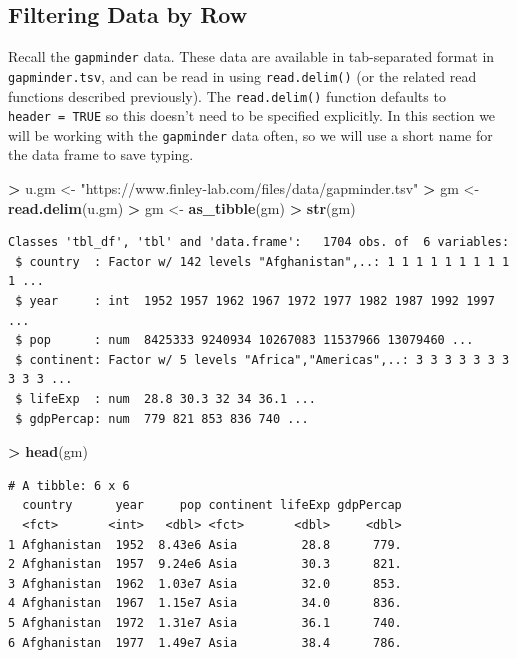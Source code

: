 \documentclass[
]{krantz}
\makeatletter
\newenvironment{Shaded}{\begin{snugshade}}{\end{snugshade}}
\newcommand{\KeywordTok}[1]{\textcolor[rgb]{0.27,0.27,0.27}{\textbf{#1}}}
\newcommand{\NormalTok}[1]{#1}
\newcommand{\OperatorTok}[1]{\textcolor[rgb]{0.43,0.43,0.43}{\textbf{#1}}}
\newcommand{\StringTok}[1]{\textcolor[rgb]{0.5,0.5,0.5}{#1}}
\newenvironment{kframe}{%
\medskip{}
\setlength{\fboxsep}{.8em}
 \def\at@end@of@kframe{}%
 \ifinner\ifhmode%
  \def\at@end@of@kframe{\end{minipage}}%
  \begin{minipage}{\columnwidth}%
 \fi\fi%
 \def\FrameCommand##1{\hskip\@totalleftmargin \hskip-\fboxsep
 \colorbox{shadecolor}{##1}\hskip-\fboxsep
     \hskip-\linewidth \hskip-\@totalleftmargin \hskip\columnwidth}%
 \MakeFramed {\advance\hsize-\width
   \@totalleftmargin\z@ \linewidth\hsize
   \@setminipage}}%
 {\par\unskip\endMakeFramed%
 \at@end@of@kframe}
\renewenvironment{Shaded}{\begin{kframe}}{\end{kframe}}
\makeatother
\begin{document}
\hypertarget{filtering-data-by-row}{%
\subsection{Filtering Data by Row}\label{filtering-data-by-row}}

Recall the \texttt{gapminder} data. These data are available in tab-separated format in \texttt{gapminder.tsv}, and can be read in using \texttt{read.delim()} (or the related read functions described previously). The \texttt{read.delim()} function defaults to \texttt{header\ =\ TRUE} so this doesn't need to be specified explicitly. In this section we will be working with the \texttt{gapminder} data often, so we will use a short name for the data frame to save typing.

\begin{Shaded}
\begin{Highlighting}[]
\OperatorTok{\textgreater{}}\StringTok{ }\NormalTok{u.gm \textless{}{-}}\StringTok{ "https://www.finley{-}lab.com/files/data/gapminder.tsv"}
\OperatorTok{\textgreater{}}\StringTok{ }\NormalTok{gm \textless{}{-}}\StringTok{ }\KeywordTok{read.delim}\NormalTok{(u.gm)}
\OperatorTok{\textgreater{}}\StringTok{ }\NormalTok{gm \textless{}{-}}\StringTok{ }\KeywordTok{as\_tibble}\NormalTok{(gm)}
\OperatorTok{\textgreater{}}\StringTok{ }\KeywordTok{str}\NormalTok{(gm)}
\end{Highlighting}
\end{Shaded}

\begin{verbatim}
Classes 'tbl_df', 'tbl' and 'data.frame':   1704 obs. of  6 variables:
 $ country  : Factor w/ 142 levels "Afghanistan",..: 1 1 1 1 1 1 1 1 1 1 ...
 $ year     : int  1952 1957 1962 1967 1972 1977 1982 1987 1992 1997 ...
 $ pop      : num  8425333 9240934 10267083 11537966 13079460 ...
 $ continent: Factor w/ 5 levels "Africa","Americas",..: 3 3 3 3 3 3 3 3 3 3 ...
 $ lifeExp  : num  28.8 30.3 32 34 36.1 ...
 $ gdpPercap: num  779 821 853 836 740 ...
\end{verbatim}

\begin{Shaded}
\begin{Highlighting}[]
\OperatorTok{\textgreater{}}\StringTok{ }\KeywordTok{head}\NormalTok{(gm)}
\end{Highlighting}
\end{Shaded}

\begin{verbatim}
# A tibble: 6 x 6
  country      year     pop continent lifeExp gdpPercap
  <fct>       <int>   <dbl> <fct>       <dbl>     <dbl>
1 Afghanistan  1952  8.43e6 Asia         28.8      779.
2 Afghanistan  1957  9.24e6 Asia         30.3      821.
3 Afghanistan  1962  1.03e7 Asia         32.0      853.
4 Afghanistan  1967  1.15e7 Asia         34.0      836.
5 Afghanistan  1972  1.31e7 Asia         36.1      740.
6 Afghanistan  1977  1.49e7 Asia         38.4      786.
\end{verbatim}
\end{document}
